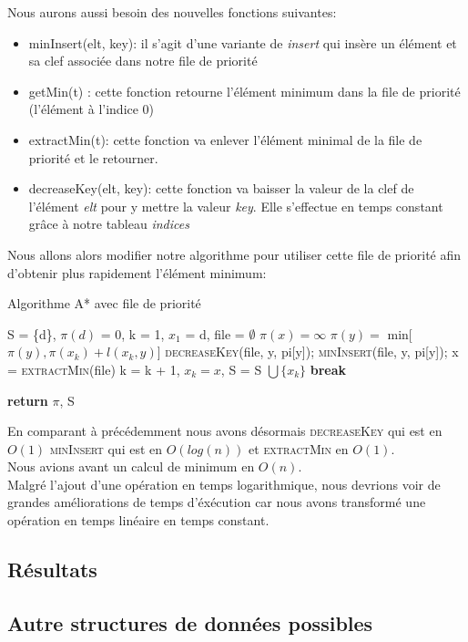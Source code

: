 \documentclass{article}
\begin{document}
Nous aurons aussi besoin des nouvelles fonctions suivantes:
\begin{itemize}
	\item minInsert(elt, key): il s'agit d'une variante de \textit{insert} qui insère un 
		élément et sa clef associée dans notre file de priorité
	\item getMin(t) : cette fonction retourne l'élément minimum dans la file de priorité (l'élément
		à l'indice 0)
	\item extractMin(t): cette fonction va enlever l'élément minimal de la file de priorité
			et le retourner.
	\item decreaseKey(elt, key): cette fonction va baisser la valeur de la clef de l'élément \textit{elt}
			pour y mettre la valeur \textit{key}. Elle s'effectue en temps constant grâce à notre 
			tableau \textit{indices}\\
\end{itemize}

Nous allons alors modifier notre algorithme pour utiliser cette file de priorité afin d'obtenir
plus rapidement l'élément minimum:

\clearpage

\begin{algorithm}
\caption{Algorithme A* avec file de priorité}\label{astar_pq}
\begin{algorithmic}[1]
	\State S = \{d\}, $\pi(d)$ = 0, k = 1, $x_1$ = d, file = $\emptyset$
		\State $\pi(x) = \infty$
	\EndFor
			\State $\pi(y) = $ min[$\pi(y), \pi(x_k) + l(x_k, y)$]
				\State \textsc{decreaseKey}(file, y, pi[y]);
			\Else
				\State \textsc{minInsert}(file, y, pi[y]);
			\EndIf
		\EndFor
		\State x = \textsc{extractMin}(file)  
		\State k = k + 1, $x_k = x$, S = S $\bigcup \{x_k\}$
			\State \textbf{break}
		\EndIf
	\EndWhile
	
	\State \textbf{return} $\pi$, S
\EndProcedure 

\end{algorithmic}
\end{algorithm}

En comparant à précédemment nous avons désormais \textsc{decreaseKey} qui est en $O(1)$
\textsc{minInsert} qui est en $O(log(n))$ et \textsc{extractMin} en $O(1)$.\\
Nous avions avant un calcul de minimum en $O(n)$.\\
Malgré l'ajout d'une opération en temps logarithmique, nous devrions voir de grandes 
améliorations de temps d'éxécution car nous avons transformé une opération en temps linéaire en
temps constant.

\subsection{Résultats}


\subsection{Autre structures de données possibles}
\end{document}
